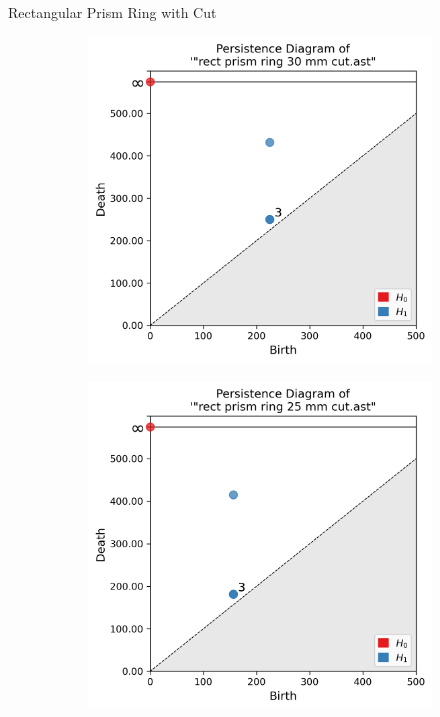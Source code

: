 \documentclass[xcolor=dvipsnames, aspectratio=169]{beamer}
\begin{document}
\begin{frame}{Rectangular Prism Ring with Cut}
\begin{figure}
\begin{subfigure}[b]{0.15\textwidth}
\end{subfigure}
\begin{subfigure}[b]{0.15\textwidth}
\includegraphics[width=\linewidth]{Final Run, (rect prism ring 30 mm cut) persdia.png}
\end{subfigure}
\begin{subfigure}[b]{0.15\textwidth}
\includegraphics[width=\linewidth]{Final Run, (rect prism ring 25 mm cut) persdia.png}

\end{subfigure}
\end{figure}
\end{frame}
\end{document}
